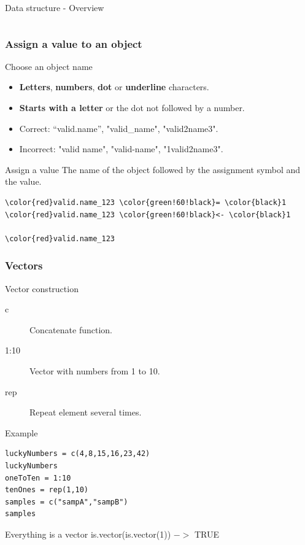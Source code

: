 \documentclass[10pt]{beamer}
\newenvironment{xframe}[2][]
  {\begin{frame}[fragile,environment=xframe,#1]
  \frametitle{#2}}
  {\end{frame}}
\begin{document}
\begin{frame}{Data structure - Overview}
\begin{columns}
\begin{column}{.2\textwidth}
    \end{column}
  \end{columns}
\end{frame}


\begin{xframe}{Assign a value to an object}
  \begin{block}{Choose an object name}
    \begin{itemize}
    \item {\bf Letters}, {\bf numbers}, {\bf dot} or {\bf underline} characters.
    \item {\bf Starts with a letter} or the dot not followed by a number.
    \item Correct: ``{\sf valid.name}'', "{\sf valid\_name}", "{\sf valid2name3}".
    \item Incorrect: "{\sf valid name}", "{\sf valid-name}", "{\sf 1valid2name3}".
    \end{itemize}
  \end{block}
  \begin{block}{Assign a value}
    The name of the object followed by the assignment symbol and the value.
    \medskip
\begin{Verbatim}[commandchars=\\\{\}]
\color{red}valid.name_123 \color{green!60!black}= \color{black}1
\color{red}valid.name_123 \color{green!60!black}<- \color{black}1

\color{red}valid.name_123
\end{Verbatim}
  \end{block}
\end{xframe}

\begin{xframe}{Vectors}
  \begin{block}{Vector construction}
    \begin{description}
    \item[c] Concatenate function.
    \item[1:10] Vector with numbers from 1 to 10.
    \item[rep] Repeat element several times.
    \end{description}
  \end{block}
  \begin{exampleblock}{Example}
\begin{verbatim}
luckyNumbers = c(4,8,15,16,23,42) 
luckyNumbers
oneToTen = 1:10
tenOnes = rep(1,10)
samples = c("sampA","sampB")
samples
\end{verbatim}
  \end{exampleblock}
  \begin{alertblock}{Everything is a vector}
    is.vector(is.vector(1)) $->$ TRUE
  \end{alertblock}
\end{xframe}
\end{document}
